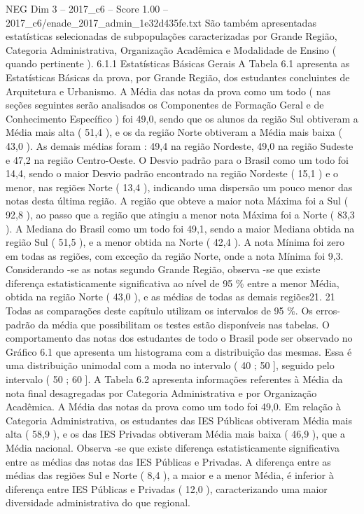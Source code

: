 \begin{textsample}{NEG Dim 3 – 2017\_c6 – Score 1.00 – 2017\_c6/enade\_2017\_admin\_1e32d435fe.txt}
São também apresentadas estatísticas selecionadas de subpopulações caracterizadas por Grande Região, Categoria Administrativa, Organização Acadêmica e Modalidade de Ensino ( quando pertinente ). 6.1.1 Estatísticas Básicas Gerais A Tabela 6.1 apresenta as Estatísticas Básicas da prova, por Grande Região, dos estudantes concluintes de Arquitetura e Urbanismo.
A Média das notas da prova como um todo ( nas seções seguintes serão analisados os Componentes de Formação Geral e de Conhecimento Específico ) foi 49,0, sendo que os alunos da região Sul obtiveram a Média mais alta ( 51,4 ), e os da região Norte obtiveram a Média mais baixa ( 43,0 ).
As demais médias foram : 49,4 na região Nordeste, 49,0 na região Sudeste e 47,2 na região Centro-Oeste.
O Desvio padrão para o Brasil como um todo foi 14,4, sendo o maior Desvio padrão encontrado na região Nordeste ( 15,1 ) e o menor, nas regiões Norte ( 13,4 ), indicando uma dispersão um pouco menor das notas desta última região.
A região que obteve a maior nota Máxima foi a Sul ( 92,8 ), ao passo que a região que atingiu a menor nota Máxima foi a Norte ( 83,3 ).
A Mediana do Brasil como um todo foi 49,1, sendo a maior Mediana obtida na região Sul ( 51,5 ), e a menor obtida na Norte ( 42,4 ).
A nota Mínima foi zero em todas as regiões, com exceção da região Norte, onde a nota Mínima foi 9,3.
Considerando -se as notas segundo Grande Região, observa -se que existe diferença estatisticamente significativa ao nível de 95 \% entre a menor Média, obtida na região Norte ( 43,0 ), e as médias de todas as demais regiões21. 21 Todas as comparações deste capítulo utilizam os intervalos de 95 \%.
Os erros-padrão da média que possibilitam os testes estão disponíveis nas tabelas.
O comportamento das notas dos estudantes de todo o Brasil pode ser observado no Gráfico 6.1 que apresenta um histograma com a distribuição das mesmas.
Essa é uma distribuição unimodal com a moda no intervalo ( 40 ; 50 ], seguido pelo intervalo ( 50 ; 60 ].
A Tabela 6.2 apresenta informações referentes à Média da nota final desagregadas por Categoria Administrativa e por Organização Acadêmica.
A Média das notas da prova como um todo foi 49,0.
Em relação à Categoria Administrativa, os estudantes das IES Públicas obtiveram Média mais alta ( 58,9 ), e os das IES Privadas obtiveram Média mais baixa ( 46,9 ), que a Média nacional.
Observa -se que existe diferença estatisticamente significativa entre as médias das notas das IES Públicas e Privadas.
A diferença entre as médias das regiões Sul e Norte ( 8,4 ), a maior e a menor Média, é inferior à diferença entre IES Públicas e Privadas ( 12,0 ), caracterizando uma maior diversidade administrativa do que regional.

\end{textsample}
